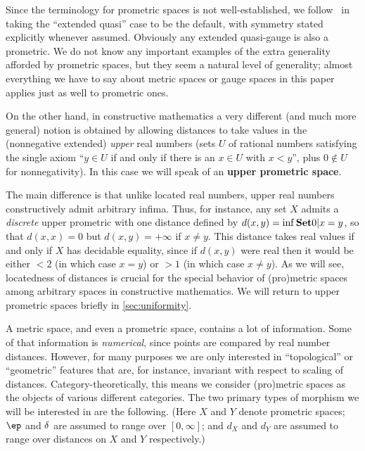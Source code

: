 \documentclass{article}
\def\Rp{[0,\infty]}
\begin{document}
Since the terminology for prometric spaces is not well-established, we follow~\cite{cht:one-setting} in taking the ``extended quasi'' case to be the default, with symmetry stated explicitly whenever assumed.
Obviously any extended quasi-gauge is also a prometric.
We do not know any important examples of the extra generality afforded by prometric spaces, but they seem a natural level of generality; almost everything we have to say about metric spaces or gauge spaces in this paper applies just as well to prometric ones.

On the other hand, in constructive mathematics a very different (and much more general) notion is obtained by allowing distances to take values in the (nonnegative extended) \emph{upper} real numbers (sets $U$ of rational numbers satisfying the single axiom ``$y\in U$ if and only if there is an $x\in U$ with $x<y$'', plus $0\notin U$ for nonnegativity).
In this case we will speak of an \textbf{upper prometric space}.

The main difference is that unlike located real numbers, upper real numbers constructively admit arbitrary infima.
Thus, for instance, any set $X$ admits a \emph{discrete} upper prometric with one distance defined by $d(x,y) = \inf \setof{ 0 | x=y }$, so that $d(x,x)=0$ but $d(x,y)=+\infty$ if $x\neq y$.
This distance takes real values if and only if $X$ has decidable equality, since if $d(x,y)$ were real then it would be either $<2$ (in which case $x=y$) or $>1$ (in which case $x\neq y$).
As we will see, locatedness of distances is crucial for the special behavior of (pro)metric spaces among arbitrary spaces in constructive mathematics.
We will return to upper prometric spaces briefly in \cref{sec:uniformity}.

A metric space, and even a prometric space, contains a lot of information.
Some of that information is \emph{numerical}, since points are compared by real number distances.
However, for many purposes we are only interested in ``topological'' or ``geometric'' features that are, for instance, invariant with respect to scaling of distances.
Category-theoretically, this means we consider (pro)metric spaces as the objects of various different categories.
The two primary types of morphism we will be interested in are the following.
(Here $X$ and $Y$ denote prometric spaces; $\ep$ and $\delta$ are assumed to range over $\Rp$; and $d_X$ and $d_Y$ are assumed to range over distances on $X$ and $Y$ respectively.)
\end{document}
